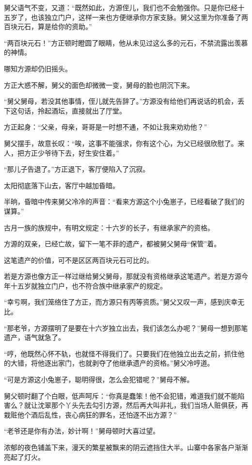 \begin{this_body}
舅父语气不变，又道：“既然如此，方源侄儿，我们也不会勉强你。只是你已经十五岁了，也该独立门户，这样一来也方便继承你方家支脉。舅父这里为你准备了两百块元石，算是给你的资助。”

“两百块元石！”方正顿时瞪圆了眼睛，他从未见过这么多的元石，不禁流露出羡慕的神情。

哪知方源却仍旧摇头。

方正大惑不解，舅父的面色却微微一变，舅母的脸也阴沉下来。

“舅父舅母，若没其他事情，侄儿就先告辞了。”方源没有给他们再说话的机会，丢下这句话，拎起酒坛，直接就出了厅堂。

方正起身：“父亲，母亲，哥哥是一时想不通，不如让我来劝劝他？”

舅父摆手，故意长叹：“唉，这事不能强求，你有这个心，为父已经很欣慰了。来人，把方正少爷待下去，好生安住着。”

“那儿子告退了。”方正退下，客厅便陷入了沉寂。

太阳彻底落下山去，客厅中越加昏暗。

半晌，昏暗中传来舅父冷冷的声音：“看来方源这个小兔崽子，已经看破了我们的谋算。”

古月一族的族规中，有明文规定：十六岁的长子，有继承家产的资格。

方源的双亲，已经亡故，留下一笔不菲的遗产，都被舅父舅母“保管”着。

这笔遗产的价值，可不是区区两百块元石可比的。

若是方源也像方正一样过继给舅父舅母，那就没有资格继承这笔遗产。若是方源今年十五岁就独立门户，也不符合族中继承家产的规定。

“幸亏啊，我们笼络住了方正，而方源只有丙等资质。”舅父又叹一声，感到庆幸无比。

“那老爷，方源摆明了是要在十六岁独立出去，我们该怎么办呢？”舅母一想到那笔遗产，语气就急了。

“哼，他既然心怀不轨，也就怪不得我们了。只要我们在他独立出去之前，抓住他的大错，将他逐出家门，也就剥夺了他继承遗产的资格。”舅父冷哼道。

“可是方源这小兔崽子，聪明得很，怎么会犯错呢？”舅母不解。

舅父顿时翻了个白眼，低声呵斥：“你真是蠢笨！他不会犯错，难道我们就不能陷害么？就让沈翠那个丫头先去勾引方源，然后再大叫非礼，我们当场人赃俱获，再栽赃他个酒后乱性，丧心病狂的罪名，还怕逐不出方源？”

“老爷还是你有办法，妙计啊！”舅母顿时大喜过望。

浓郁的夜色铺盖下来，漫天的繁星被飘来的阴云遮挡住大半。山寨中各家各户渐渐亮起了灯火。


\end{this_body}

